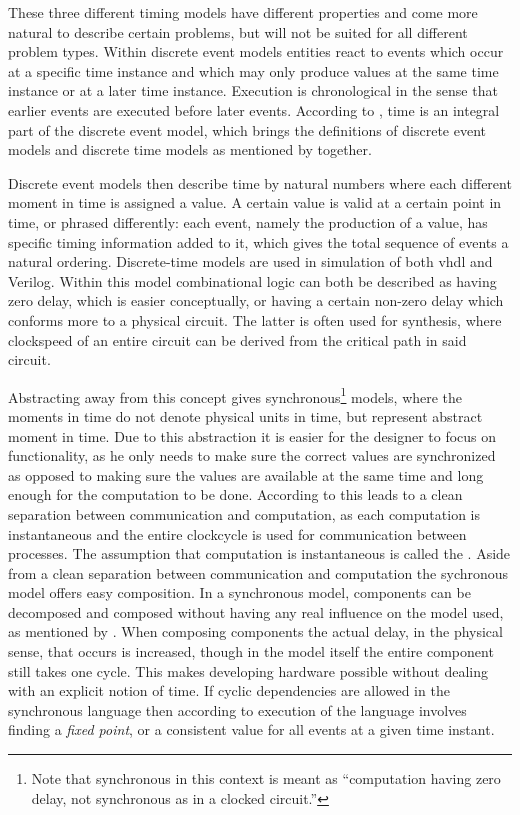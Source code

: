 These three different timing models have different properties and come more natural to describe certain problems, but will not be suited for all different problem types. 
Within discrete event models entities react to events which occur at a specific time instance and which may only produce values at the same time instance or at a later time instance. 
Execution is chronological in the sense that earlier events are executed before later events.
According to \cite{chang1997heterogeneous}, time is an integral part of the discrete event model, which brings the definitions of discrete event models and discrete time models as mentioned by \cite{jantsch2005models} together.

Discrete event models then describe time by natural numbers where each different moment in time is assigned a value. 
A certain value is valid at a certain point in time, or phrased differently: each event, namely the production of a value, has specific timing information added to it, which gives the total sequence of events a natural ordering. 
Discrete-time models are used in simulation of both \gls{vhdl} and Verilog. 
Within this model combinational logic can both be described as having zero delay, which is easier conceptually, or having a certain non-zero delay which conforms more to a physical circuit. 
The latter is often used for synthesis, where clockspeed of an entire circuit can be derived from the critical path in said circuit. 

Abstracting away from this concept gives synchronous\footnote{Note that synchronous in this context is meant as ``computation having zero delay, not synchronous as in a clocked circuit.''} models, where the moments in time do not denote physical units in time, but represent abstract moment in time. 
Due to this abstraction it is easier for the designer to focus on functionality, as he only needs to make sure the correct values are synchronized as opposed to making sure the values are available at the same time and long enough for the computation to be done.
According to \cite{jantsch2005models} this leads to a clean separation between communication and computation, as each computation is instantaneous and the entire clockcycle is used for communication between processes. 
The assumption that computation is instantaneous is called the .
Aside from a clean separation between communication and computation the sychronous model offers easy composition.
In a synchronous model, components can be decomposed and composed without having any real influence on the model used, as mentioned by \cite{benveniste1991synchronous}.
When composing components the actual delay, in the physical sense, that occurs is increased, though in the model itself the entire component still takes one cycle. 
This makes developing hardware possible without dealing with an explicit notion of time.
If cyclic dependencies are allowed in the synchronous language then according to \cite{chang1997heterogeneous} execution of the language involves finding a \textit{fixed point}, or a consistent value for all events at a given time instant.


